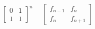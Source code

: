 \documentclass[12pt]{article}
\begin{document}
$
{\left[ \begin{array}{cc}
	0 & 1 \\
	1 & 1 \end{array} \right]}^n
=
\left[ \begin{array}{cc}
	f_{n-1}	&	f_n \\
	f_n	&	f_{n+1} \end{array} \right]
$
\end{document}
